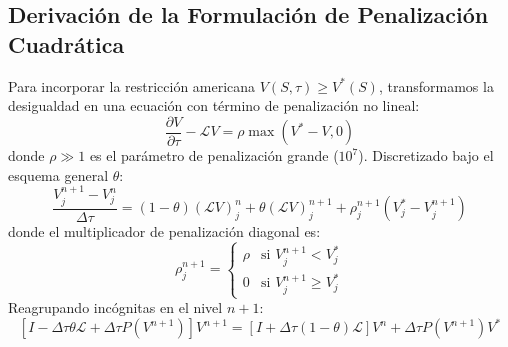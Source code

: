 \documentclass[11pt,a4paper]{article}
\begin{document}
\subsection{Derivación de la Formulación de Penalización Cuadrática}
Para incorporar la restricción americana $V(S, \tau) \ge V^*(S)$, transformamos la desigualdad en una ecuación con término de penalización no lineal:
\begin{equation}
    \frac{\partial V}{\partial \tau} - \mathcal{L} V = \rho \max(V^* - V, 0)
\end{equation}
donde $\rho \gg 1$ es el parámetro de penalización grande ($10^7$).
Discretizado bajo el esquema general $\theta$:
\begin{equation}
    \frac{V_j^{n+1} - V_j^n}{\Delta \tau} = (1 - \theta) (\mathcal{L} V)_j^n + \theta (\mathcal{L} V)_j^{n+1} + \rho_j^{n+1} (V_j^* - V_j^{n+1})
\end{equation}
donde el multiplicador de penalización diagonal es:
\begin{equation}
    \rho_j^{n+1} = \begin{cases}
        \rho & \text{si } V_j^{n+1} < V_j^* \\
        0 & \text{si } V_j^{n+1} \ge V_j^*
    \end{cases}
\end{equation}
Reagrupando incógnitas en el nivel $n+1$:
\begin{equation}
    \left[ I - \Delta \tau \theta \mathcal{L} + \Delta \tau P(V^{n+1}) \right] V^{n+1} = \left[ I + \Delta \tau (1 - \theta) \mathcal{L} \right] V^n + \Delta \tau P(V^{n+1}) V^*
\end{equation}
\end{document}
